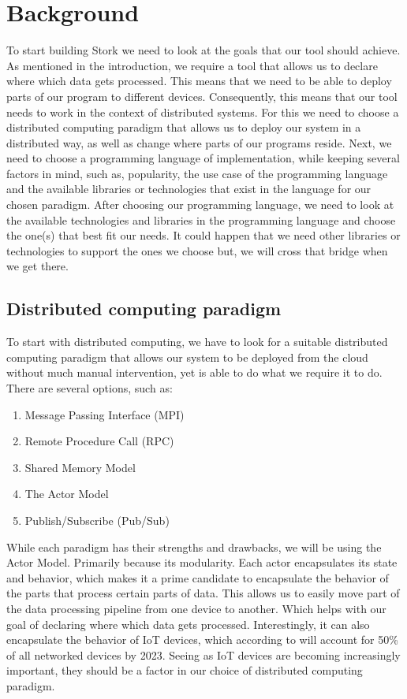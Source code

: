 \documentclass[a4paper]{article}
\begin{document}
\section{Background}
To start building Stork we need to look at the goals that our tool should achieve. As mentioned in the introduction, we require a tool that allows us to declare where which data gets processed. This means that we need to be able to deploy parts of our program to different devices. Consequently, this means that our tool needs to work in the context of distributed systems. For this we need to choose a distributed computing paradigm that allows us to deploy our system in a distributed way, as well as change where parts of our programs reside.
Next, we need to choose a programming language of implementation, while keeping several factors in mind, such as, popularity, the use case of the programming language and the available libraries or technologies that exist in the language for our chosen paradigm.
After choosing our programming language, we need to look at the available technologies and libraries in the programming language and choose the one(s) that best fit our needs. It could happen that we need other libraries or technologies to support the ones we choose but, we will cross that bridge when we get there.
\subsection{Distributed computing paradigm}
To start with distributed computing, we have to look for a suitable distributed computing paradigm that allows our system to be deployed from the cloud without much manual intervention, yet is able to do what we require it to do. There are several options, such as:
\begin{enumerate}
    \item Message Passing Interface (MPI)\cite{MPI}
    \item Remote Procedure Call (RPC)\cite{RPC}
    \item Shared Memory Model\cite{SMM}
    \item The Actor Model\cite{ActorModel}
    \item Publish/Subscribe (Pub/Sub)\cite{PubSub}
\end{enumerate} 
While each paradigm has their strengths and drawbacks, we will be using the Actor Model. Primarily because its modularity. Each actor encapsulates its state and behavior, which makes it a prime candidate to encapsulate the behavior of the parts that process certain parts of data. This allows us to easily move part of the data processing pipeline from one device to another. Which helps with our goal of declaring where which data gets processed. Interestingly, it can also encapsulate the behavior of IoT devices, which according to \cite{differentnetworkneedsiot} will account for 50\% of all networked devices by 2023. Seeing as IoT devices are becoming increasingly important, they should be a factor in our choice of distributed computing paradigm.
\end{document}
